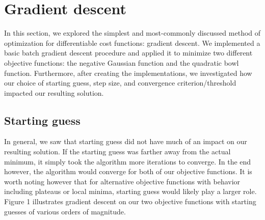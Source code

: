 \documentclass{article}
\begin{document}

\section{Gradient descent}

In this section, we explored the simplest and most-commonly discussed method of optimization for differentiable cost functions: gradient descent. We implemented a basic batch gradient descent procedure and applied it to minimize two different objective functions: the negative Gaussian function and the quadratic bowl function. Furthermore, after creating the implementations, we investigated how our choice of starting guess, step size, and convergence criterion/threshold impacted our resulting solution.

\subsection{Starting guess}
In general, we saw that starting guess did not have much of an impact on our resulting solution. If the starting guess was farther away from the actual minimum, it simply took the algorithm more iterations to converge. In the end however, the algorithm would converge for both of our objective functions. It is worth noting however that for alternative objective functions with behavior including plateaus or local minima, starting guess would likely play a larger role. Figure 1 illustrates gradient descent on our two objective functions with starting guesses of various orders of magnitude.
\end{document}
